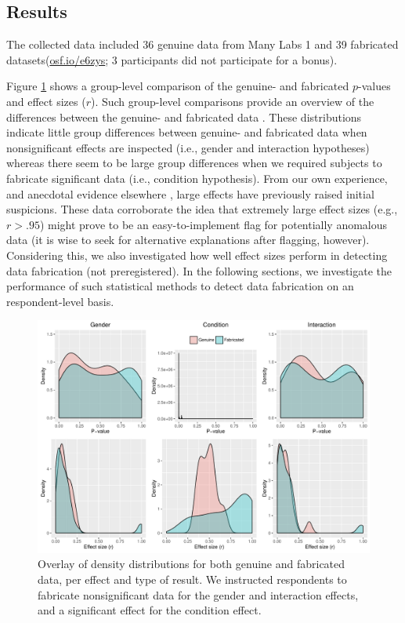 \documentclass{article}
\begin{document}
\subsection*{Results}


The collected data included 36 genuine data from Many Labs 1 \citep[\url{osf.io/pqf9r};][]{klein2014} and 39 fabricated datasets(\url{osf.io/e6zys}; 3 participants did not participate for a bonus). 

Figure \ref{densities} shows a group-level comparison of the genuine- and fabricated $p$-values and effect sizes ($r$). Such group-level comparisons provide an overview of the differences between the genuine- and fabricated data \citep[see also][]{Akhtar-Danesh2003}. These distributions indicate little group differences between genuine- and fabricated data when nonsignificant effects are inspected (i.e., gender and interaction hypotheses) whereas there seem to be large group differences when we required subjects to fabricate significant data (i.e., condition hypothesis). From our own experience, and anecdotal evidence elsewhere \citep{BAILEY1991741}, large effects have previously raised initial suspicions. These data corroborate the idea that extremely large effect sizes (e.g., $r>.95$) might prove to be an easy-to-implement flag for potentially anomalous data (it is wise to seek for alternative explanations after flagging, however). Considering this, we also investigated how well effect sizes perform in detecting data fabrication (not preregistered). In the following sections, we investigate the performance of such statistical methods to detect data fabrication on an respondent-level basis.

\begin{figure}[!ht]
\begin{center}
\includegraphics[width=\textwidth,height=\textheight,keepaspectratio]{../figures/ddfab_density.pdf}
\caption{Overlay of density distributions for both genuine and fabricated data, per effect and type of result. We instructed respondents to fabricate nonsignificant data for the gender and interaction effects, and a significant effect for the condition effect.}
\label{densities}
\end{center}
\end{figure}
\end{document}
